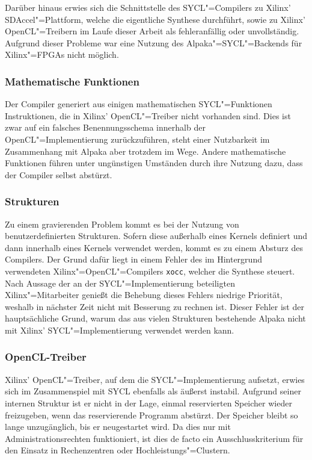 Darüber hinaus erwies sich die Schnittstelle des SYCL"=Compilers zu Xilinx'
SDAccel"=Plattform, welche die eigentliche Synthese durchführt, sowie zu Xilinx'
OpenCL"=Treibern im Laufe dieser Arbeit als fehleranfällig oder unvollständig.
Aufgrund dieser Probleme war eine Nutzung des Alpaka"=SYCL"=Backends für
Xilinx"=FPGAs nicht möglich.

\subsubsection{Mathematische Funktionen}

Der Compiler generiert aus einigen mathematischen SYCL"=Funktionen
Instruktionen, die in Xilinx' OpenCL"=Treiber nicht vorhanden sind. Dies ist
zwar auf ein falsches Benennungsschema innerhalb der OpenCL"=Implementierung
zurückzuführen, steht einer Nutzbarkeit im Zusammenhang mit Alpaka aber trotzdem
im Wege. Andere mathematische Funktionen führen unter ungünstigen Umständen
durch ihre Nutzung dazu, dass der Compiler selbst abstürzt.  

\subsubsection{Strukturen}

Zu einem gravierenden Problem kommt es bei der Nutzung von benutzerdefinierten
Strukturen. Sofern diese außerhalb eines Kernels definiert und dann innerhalb
eines Kernels verwendet werden, kommt es zu einem Absturz des Compilers. Der
Grund dafür liegt in einem Fehler des im Hintergrund verwendeten
Xilinx"=OpenCL"=Compilers \texttt{xocc}, welcher die Synthese steuert. Nach
Aussage der an der SYCL"=Implementierung beteiligten Xilinx"=Mitarbeiter genießt
die Behebung dieses Fehlers niedrige Priorität, weshalb in nächster Zeit nicht
mit Besserung zu rechnen ist. Dieser Fehler ist der hauptsächliche Grund, warum
das aus vielen Strukturen bestehende Alpaka nicht mit Xilinx'
SYCL"=Implementierung verwendet werden kann.

\subsubsection{OpenCL-Treiber}

Xilinx' OpenCL"=Treiber, auf dem die SYCL"=Implementierung aufsetzt, erwies sich
im Zusammenspiel mit SYCL ebenfalls als äußerst instabil. Aufgrund seiner
internen Struktur ist er nicht in der Lage, einmal reservierten Speicher wieder
freizugeben, wenn das reservierende Programm abstürzt. Der Speicher bleibt so
lange unzugänglich, bis er neugestartet wird. Da dies nur mit
Administrationsrechten funktioniert, ist dies de facto ein Ausschlusskriterium
für den Einsatz in Rechenzentren oder Hochleistungs"=Clustern.

